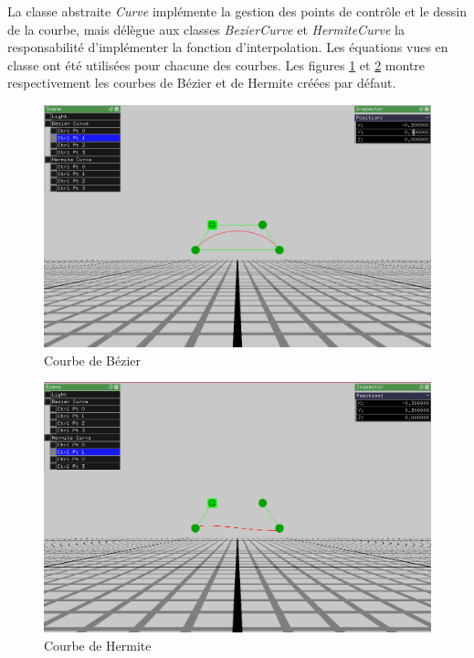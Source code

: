 La classe abstraite \emph{Curve} implémente la gestion des points de contrôle et le dessin de la courbe, mais délègue aux classes \emph{BezierCurve} et \emph{HermiteCurve} la responsabilité d'implémenter la fonction d'interpolation.
Les équations vues en classe ont été utilisées pour chacune des courbes.
Les figures \ref{fig:courbe_bezier} et \ref{fig:courbe_hermite} montre respectivement les courbes de Bézier et de Hermite créées par défaut.

\begin{figure}[H]
    \centering
	\includegraphics[scale=0.4]{fig/bezier.png}
	\caption{Courbe de Bézier}
	\label{fig:courbe_bezier}
\end{figure}

\begin{figure}[H]
    \centering
	\includegraphics[scale=0.4]{fig/hermite.png}
	\caption{Courbe de Hermite}
	\label{fig:courbe_hermite}
\end{figure}

